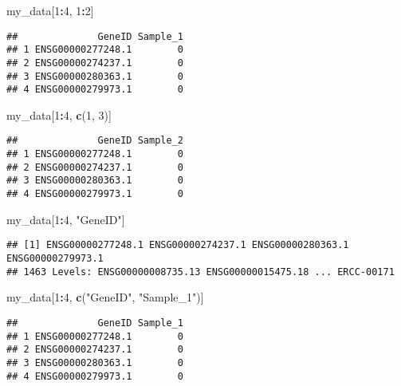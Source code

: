 \documentclass[]{article}
\newenvironment{Shaded}{\begin{snugshade}}{\end{snugshade}}
\newcommand{\KeywordTok}[1]{\textcolor[rgb]{0.13,0.29,0.53}{\textbf{#1}}}
\newcommand{\DecValTok}[1]{\textcolor[rgb]{0.00,0.00,0.81}{#1}}
\newcommand{\StringTok}[1]{\textcolor[rgb]{0.31,0.60,0.02}{#1}}
\newcommand{\OperatorTok}[1]{\textcolor[rgb]{0.81,0.36,0.00}{\textbf{#1}}}
\newcommand{\NormalTok}[1]{#1}
\begin{document}
\begin{Shaded}
\begin{Highlighting}[]
\NormalTok{my_data[}\DecValTok{1}\OperatorTok{:}\DecValTok{4}\NormalTok{, }\DecValTok{1}\OperatorTok{:}\DecValTok{2}\NormalTok{]}
\end{Highlighting}
\end{Shaded}

\begin{verbatim}
##              GeneID Sample_1
## 1 ENSG00000277248.1        0
## 2 ENSG00000274237.1        0
## 3 ENSG00000280363.1        0
## 4 ENSG00000279973.1        0
\end{verbatim}

\begin{Shaded}
\begin{Highlighting}[]
\NormalTok{my_data[}\DecValTok{1}\OperatorTok{:}\DecValTok{4}\NormalTok{, }\KeywordTok{c}\NormalTok{(}\DecValTok{1}\NormalTok{, }\DecValTok{3}\NormalTok{)]}
\end{Highlighting}
\end{Shaded}

\begin{verbatim}
##              GeneID Sample_2
## 1 ENSG00000277248.1        0
## 2 ENSG00000274237.1        0
## 3 ENSG00000280363.1        0
## 4 ENSG00000279973.1        0
\end{verbatim}

\begin{Shaded}
\begin{Highlighting}[]
\NormalTok{my_data[}\DecValTok{1}\OperatorTok{:}\DecValTok{4}\NormalTok{, }\StringTok{"GeneID"}\NormalTok{]}
\end{Highlighting}
\end{Shaded}

\begin{verbatim}
## [1] ENSG00000277248.1 ENSG00000274237.1 ENSG00000280363.1 ENSG00000279973.1
## 1463 Levels: ENSG00000008735.13 ENSG00000015475.18 ... ERCC-00171
\end{verbatim}

\begin{Shaded}
\begin{Highlighting}[]
\NormalTok{my_data[}\DecValTok{1}\OperatorTok{:}\DecValTok{4}\NormalTok{, }\KeywordTok{c}\NormalTok{(}\StringTok{"GeneID"}\NormalTok{, }\StringTok{"Sample_1"}\NormalTok{)]}
\end{Highlighting}
\end{Shaded}

\begin{verbatim}
##              GeneID Sample_1
## 1 ENSG00000277248.1        0
## 2 ENSG00000274237.1        0
## 3 ENSG00000280363.1        0
## 4 ENSG00000279973.1        0
\end{verbatim}
\end{document}
